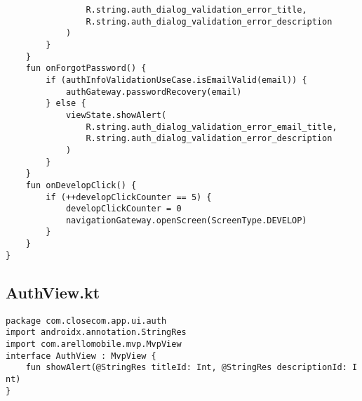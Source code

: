 \documentclass[listing]{espd}
\begin{document}
\begin{verbatim}
                R.string.auth_dialog_validation_error_title,
                R.string.auth_dialog_validation_error_description
            )
        }
    }
    fun onForgotPassword() {
        if (authInfoValidationUseCase.isEmailValid(email)) {
            authGateway.passwordRecovery(email)
        } else {
            viewState.showAlert(
                R.string.auth_dialog_validation_error_email_title,
                R.string.auth_dialog_validation_error_description
            )
        }
    }
    fun onDevelopClick() {
        if (++developClickCounter == 5) {
            developClickCounter = 0
            navigationGateway.openScreen(ScreenType.DEVELOP)
        }
    }
}
\end{verbatim}

\subsection{AuthView.kt}
\begin{verbatim}
package com.closecom.app.ui.auth
import androidx.annotation.StringRes
import com.arellomobile.mvp.MvpView
interface AuthView : MvpView {
    fun showAlert(@StringRes titleId: Int, @StringRes descriptionId: I
nt)
}
\end{verbatim}
\end{document}
